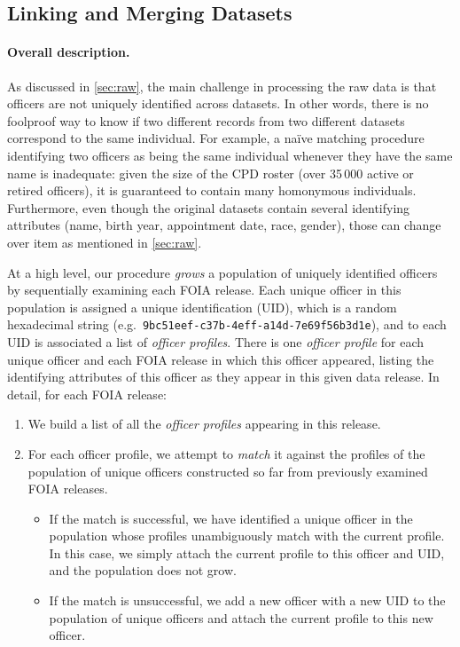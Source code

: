 \subsection{Linking and Merging Datasets}\label{sec:linking}
\label{sec:linking}

\paragraph{Overall description.}

As discussed in \cref{sec:raw}, the main challenge in processing the raw data
is that officers are not uniquely identified across datasets. In other words,
there is no foolproof way to know if two different records from two different
datasets correspond to the same individual. For example, a na\"ive matching
procedure identifying two officers as being the same individual whenever they
have the same name is inadequate: given the size of the CPD roster (over 35\,000
active or retired officers), it is guaranteed to contain many homonymous
individuals. Furthermore, even though the original datasets contain several
identifying attributes (name, birth year, appointment date, race, gender),
those can change over item as mentioned in \cref{sec:raw}.

At a high level, our procedure \emph{grows} a population of uniquely identified
officers by sequentially examining each FOIA release. Each unique officer in
this population is assigned a unique identification (UID), which is a random
hexadecimal string (e.g.\ \texttt{9bc51eef-c37b-4eff-a14d-7e69f56b3d1e}), and
to each UID is associated a list of \emph{officer profiles}. There is one
\emph{officer profile} for each unique officer and each FOIA release in which
this officer appeared, listing the identifying attributes of this officer as
they appear in this given data release. In detail, for each FOIA release:
\begin{enumerate}
	\item We build a list of all the \emph{officer profiles} appearing in this
		release.
	\item For each officer profile, we attempt to \emph{match} it against the
		profiles of the population of unique officers constructed so far from
		previously examined FOIA releases.
		\begin{itemize}
			\item If the match is successful, we have identified a unique officer in
				the population whose profiles unambiguously match with the
				current profile. In this case, we simply attach the current
				profile to this officer and UID, and
				the population does not grow.
			\item If the match is unsuccessful, we add a new officer with a new UID to the population of unique
				officers and attach the current profile to this new officer.
		\end{itemize}
\end{enumerate}


